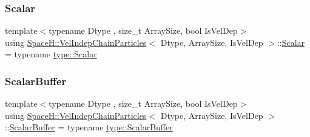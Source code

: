 \subsubsection{\texorpdfstring{Scalar}{Scalar}\hspace{0.1cm}{\footnotesize\ttfamily [2/2]}}
{\footnotesize\ttfamily template$<$typename Dtype , size\+\_\+t Array\+Size, bool Is\+Vel\+Dep$>$ \\
using \mbox{\hyperlink{class_space_h_1_1_vel_indep_chain_particles}{Space\+H\+::\+Vel\+Indep\+Chain\+Particles}}$<$ Dtype, Array\+Size, Is\+Vel\+Dep $>$\+::\mbox{\hyperlink{class_space_h_1_1_vel_indep_particles_aeb47d8131b30ed790320ff634f0d6af1}{Scalar}} =  typename \mbox{\hyperlink{struct_space_h_1_1_proto_type_af3c8245d83d9db64749882920de5c274}{type\+::\+Scalar}}}

\mbox{\label{class_space_h_1_1_vel_indep_chain_particles_a82b6905aa4abfd82951138f0636b6b3f}} 
\subsubsection{\texorpdfstring{Scalar\+Buffer}{ScalarBuffer}\hspace{0.1cm}{\footnotesize\ttfamily [1/2]}}
{\footnotesize\ttfamily template$<$typename Dtype , size\+\_\+t Array\+Size, bool Is\+Vel\+Dep$>$ \\
using \mbox{\hyperlink{class_space_h_1_1_vel_indep_chain_particles}{Space\+H\+::\+Vel\+Indep\+Chain\+Particles}}$<$ Dtype, Array\+Size, Is\+Vel\+Dep $>$\+::\mbox{\hyperlink{class_space_h_1_1_vel_indep_particles_abca40159a816385790d5a6fd19c1dc6d}{Scalar\+Buffer}} =  typename \mbox{\hyperlink{struct_space_h_1_1_proto_type_a62c491884996da10377d348a5aabad86}{type\+::\+Scalar\+Buffer}}}

\mbox{\label{class_space_h_1_1_vel_indep_chain_particles_a82b6905aa4abfd82951138f0636b6b3f}} 
